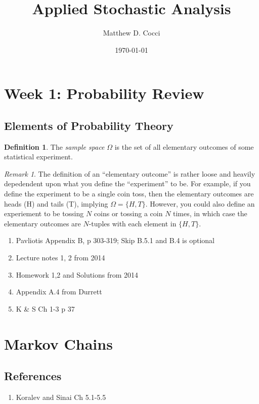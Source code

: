 \documentclass[12pt]{article}
\author{Matthew D. Cocci}
\title{Applied Stochastic Analysis}
\date{\today}
\theoremstyle{plain}
\theoremstyle{definition}
\newtheorem{defn}[thm]{Definition}
\theoremstyle{remark}
\newtheorem*{rmk}{Remark}
\begin{document}
\maketitle

\tableofcontents

\clearpage
\section{Week 1: Probability Review}

\subsection{Elements of Probability Theory}

\begin{defn}
The \emph{sample space} $\Omega$ is the set of all elementary outcomes
of some statistical experiment.
\end{defn}
\begin{rmk}
The definition of an ``elementary outcome'' is rather loose and heavily
depedendent upon what you define the ``experiment'' to be. For example,
if you define the experiment to be a single coin toss, then the
elementary outcomes are heads (H) and tails (T), implying $\Omega =
\{H,T\}$. However, you could also define an experiement to be tossing
$N$ coins or tossing a coin $N$ times, in which case the elementary
outcomes are $N$-tuples with each element in $\{H,T\}$.
\end{rmk}



\begin{enumerate}
  \item Pavliotis Appendix B, p 303-319; Skip B.5.1 and B.4 is optional
  \item Lecture notes 1, 2 from 2014
  \item Homework 1,2 and Solutions from 2014
  \item Appendix A.4 from Durrett
  \item K \& S Ch 1-3 p 37
\end{enumerate}

\section{Markov Chains}

\subsection{References}
\begin{enumerate}
  \item Koralev and Sinai Ch 5.1-5.5
\end{enumerate}
\end{document}
